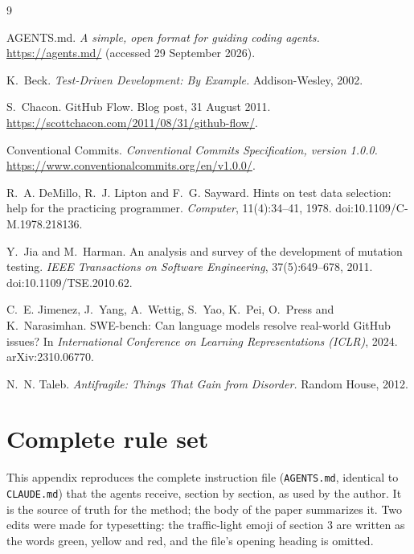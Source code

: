 \documentclass[11pt,a4paper]{article}
\begin{document}
\begin{thebibliography}{9}
\small

AGENTS.md. \emph{A simple, open format for guiding coding agents.} \url{https://agents.md/} (accessed 29 September 2026).

K.~Beck. \emph{Test-Driven Development: By Example.} Addison-Wesley, 2002.

S.~Chacon. GitHub Flow. Blog post, 31 August 2011. \url{https://scottchacon.com/2011/08/31/github-flow/}.

Conventional Commits. \emph{Conventional Commits Specification, version 1.0.0.} \url{https://www.conventionalcommits.org/en/v1.0.0/}.

R.~A. DeMillo, R.~J. Lipton and F.~G. Sayward. Hints on test data selection: help for the practicing programmer. \emph{Computer}, 11(4):34--41, 1978. doi:10.1109/C-M.1978.218136.

Y.~Jia and M.~Harman. An analysis and survey of the development of mutation testing. \emph{IEEE Transactions on Software Engineering}, 37(5):649--678, 2011. doi:10.1109/TSE.2010.62.

C.~E. Jimenez, J.~Yang, A.~Wettig, S.~Yao, K.~Pei, O.~Press and K.~Narasimhan. SWE-bench: Can language models resolve real-world GitHub issues? In \emph{International Conference on Learning Representations (ICLR)}, 2024. arXiv:2310.06770.

N.~N. Taleb. \emph{Antifragile: Things That Gain from Disorder.} Random House, 2012.

\end{thebibliography}

\appendix

\section{Complete rule set}
\label{app:rules}

This appendix reproduces the complete instruction file (\texttt{AGENTS.md}, identical to \texttt{CLAUDE.md}) that the agents receive, section by section, as used by the author. It is the source of truth for the method; the body of the paper summarizes it. Two edits were made for typesetting: the traffic-light emoji of section 3 are written as the words green, yellow and red, and the file's opening heading is omitted.
\end{document}
